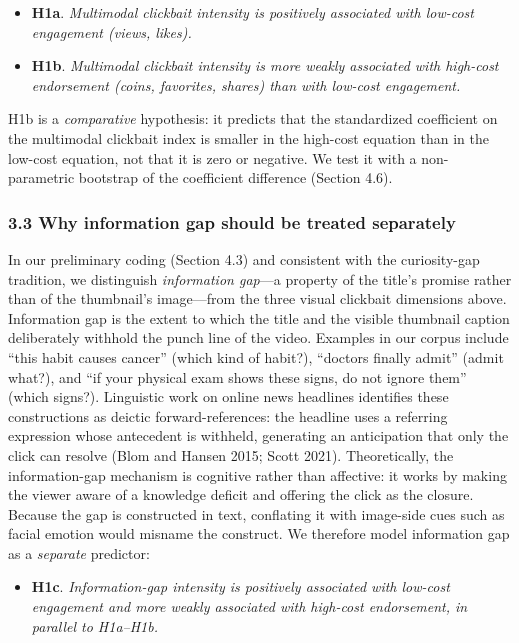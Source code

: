 \documentclass[
  12pt,
]{article}
\providecommand{\tightlist}{%
  \setlength{\itemsep}{0pt}\setlength{\parskip}{0pt}}
\begin{document}
\begin{itemize}
\tightlist
\item
  \textbf{H1a}. \emph{Multimodal clickbait intensity is positively
  associated with low-cost engagement (views, likes).}
\item
  \textbf{H1b}. \emph{Multimodal clickbait intensity is more weakly
  associated with high-cost endorsement (coins, favorites, shares) than
  with low-cost engagement.}
\end{itemize}

H1b is a \emph{comparative} hypothesis: it predicts that the
standardized coefficient on the multimodal clickbait index is smaller in
the high-cost equation than in the low-cost equation, not that it is
zero or negative. We test it with a non-parametric bootstrap of the
coefficient difference (Section 4.6).

\subsubsection{3.3 Why information gap should be treated
separately}\label{why-information-gap-should-be-treated-separately}

In our preliminary coding (Section 4.3) and consistent with the
curiosity-gap tradition, we distinguish \emph{information gap}---a
property of the title's promise rather than of the thumbnail's
image---from the three visual clickbait dimensions above. Information
gap is the extent to which the title and the visible thumbnail caption
deliberately withhold the punch line of the video. Examples in our
corpus include ``this habit causes cancer'' (which kind of habit?),
``doctors finally admit'' (admit what?), and ``if your physical exam
shows these signs, do not ignore them'' (which signs?). Linguistic work
on online news headlines identifies these constructions as deictic
forward-references: the headline uses a referring expression whose
antecedent is withheld, generating an anticipation that only the click
can resolve (Blom and Hansen 2015; Scott 2021). Theoretically, the
information-gap mechanism is cognitive rather than affective: it works
by making the viewer aware of a knowledge deficit and offering the click
as the closure. Because the gap is constructed in text, conflating it
with image-side cues such as facial emotion would misname the construct.
We therefore model information gap as a \emph{separate} predictor:

\begin{itemize}
\tightlist
\item
  \textbf{H1c}. \emph{Information-gap intensity is positively associated
  with low-cost engagement and more weakly associated with high-cost
  endorsement, in parallel to H1a--H1b.}
\end{itemize}
\end{document}
